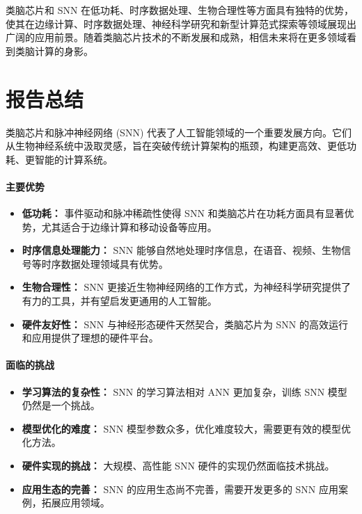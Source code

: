 \documentclass[12pt, a4paper, oneside]{ctexart}
\numberwithin{equation}{section}  %
\begin{document}
类脑芯片和 SNN 在低功耗、时序数据处理、生物合理性等方面具有独特的优势，使其在边缘计算、时序数据处理、神经科学研究和新型计算范式探索等领域展现出广阔的应用前景。随着类脑芯片技术的不断发展和成熟，相信未来将在更多领域看到类脑计算的身影。

\section{报告总结}
类脑芯片和脉冲神经网络 (SNN) 代表了人工智能领域的一个重要发展方向。它们从生物神经系统中汲取灵感，旨在突破传统计算架构的瓶颈，构建更高效、更低功耗、更智能的计算系统\cite{ref11}。

\paragraph{主要优势}

\begin{itemize}
    \item \textbf{低功耗：} 事件驱动和脉冲稀疏性使得 SNN 和类脑芯片在功耗方面具有显著优势，尤其适合于边缘计算和移动设备等应用。
    \item \textbf{时序信息处理能力：} SNN 能够自然地处理时序信息，在语音、视频、生物信号等时序数据处理领域具有优势。
    \item \textbf{生物合理性：} SNN 更接近生物神经网络的工作方式，为神经科学研究提供了有力的工具，并有望启发更通用的人工智能。
    \item \textbf{硬件友好性：} SNN 与神经形态硬件天然契合，类脑芯片为 SNN 的高效运行和应用提供了理想的硬件平台。
\end{itemize}

\paragraph{面临的挑战}

\begin{itemize}
    \item \textbf{学习算法的复杂性：} SNN 的学习算法相对 ANN 更加复杂，训练 SNN 模型仍然是一个挑战。
    \item \textbf{模型优化的难度：} SNN 模型参数众多，优化难度较大，需要更有效的模型优化方法。
    \item \textbf{硬件实现的挑战：} 大规模、高性能 SNN 硬件的实现仍然面临技术挑战。
    \item \textbf{应用生态的完善：} SNN 的应用生态尚不完善，需要开发更多的 SNN 应用案例，拓展应用领域。
\end{itemize}
\end{document}
